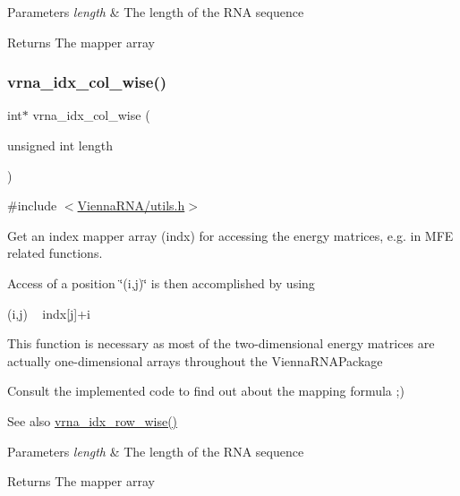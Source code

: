 \begin{DoxyParams}{Parameters}
{\em length} & The length of the R\+NA sequence \\
\hline
\end{DoxyParams}
\begin{DoxyReturn}{Returns}
The mapper array 
\end{DoxyReturn}
\mbox{\label{group__utils_ga89ebc69c52fa0c78c9e1974b0017746b}} 
\subsubsection{\texorpdfstring{vrna\+\_\+idx\+\_\+col\+\_\+wise()}{vrna\_idx\_col\_wise()}}
{\footnotesize\ttfamily int$\ast$ vrna\+\_\+idx\+\_\+col\+\_\+wise (\begin{DoxyParamCaption}\item[{unsigned int}]{length }\end{DoxyParamCaption})}



{\ttfamily \#include $<$\hyperlink{utils_8h}{Vienna\+R\+N\+A/utils.\+h}$>$}



Get an index mapper array (indx) for accessing the energy matrices, e.\+g. in M\+FE related functions. 

Access of a position \char`\"{}(i,j)\char`\"{} is then accomplished by using\begin{DoxyVerb}(i,j) ~ indx[j]+i \end{DoxyVerb}
 This function is necessary as most of the two-\/dimensional energy matrices are actually one-\/dimensional arrays throughout the Vienna\+R\+N\+A\+Package

Consult the implemented code to find out about the mapping formula ;)

\begin{DoxySeeAlso}{See also}
\hyperlink{group__utils_ga70b180e9ea764218a82647a1cd347445}{vrna\+\_\+idx\+\_\+row\+\_\+wise()} 
\end{DoxySeeAlso}

\begin{DoxyParams}{Parameters}
{\em length} & The length of the R\+NA sequence \\
\hline
\end{DoxyParams}
\begin{DoxyReturn}{Returns}
The mapper array 
\end{DoxyReturn}


